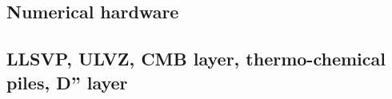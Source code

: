 {\scriptsize
\noindent
\cite{kara84}
\cite{brcp99}
\cite{dets01}\cite{solo01}
\cite{soet02}
\cite{hapa03}\cite{reyu03}
\cite{sore08}
\cite{rorb11}
\cite{beri13}
\cite{besr14}
\cite{thrk15}\cite{tukb15}\cite{pevp15}\cite{glfa15}
\cite{ceww17}\cite{daef17}\cite{mube17}\cite{scdu17}
\cite{bemu18}\cite{bezb18}\cite{mube18}
\cite{mube19}
}

\subsection{Numerical hardware}
\label{sec:topics:hardware}

\cite{oebm06}



\subsection{LLSVP, ULVZ, CMB layer, thermo-chemical piles, D'' layer}

